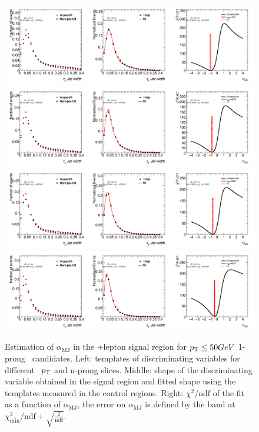 	\begin{figure}
	\begin{center}
	\includegraphics[width=1\textwidth]{chapters/chapter6_HPlus/images/FFs/FFs_FIT_SR_TAULEP_1_30_35.png}
	\includegraphics[width=1\textwidth]{chapters/chapter6_HPlus/images/FFs/FFs_FIT_SR_TAULEP_1_35_40.png}
	\includegraphics[width=1\textwidth]{chapters/chapter6_HPlus/images/FFs/FFs_FIT_SR_TAULEP_1_40_45.png}
	\includegraphics[width=1\textwidth]{chapters/chapter6_HPlus/images/FFs/FFs_FIT_SR_TAULEP_1_45_50.png}
	\end{center}
	\caption{
	Estimation of $\alpha_\mathrm{MJ}$ in the \tauhad+lepton signal region for $p_{\text{T}} \leq 50 GeV$
	1-prong \tauhad\ candidates. Left: templates of discriminating variables for different \tauhad\ $p_{\text{T}}$
	and n-prong slices. Middle: shape of the discriminating variable obtained in the signal region and fitted
	shape using the templates measured in the control regions. Right: $\chi^2/\mathrm{ndf}$ of the fit as a
	function of $\alpha_\mathrm{MJ}$, the error on $\alpha_\mathrm{MJ}$ is defined by the band at
	$\chi^2_\mathrm{min}/\mathrm{ndf}+\sqrt{\frac{2}{\mathrm{ndf}}}$.
	}
	\label{fig:mm:Fits:region7_1}
	\end{figure}


